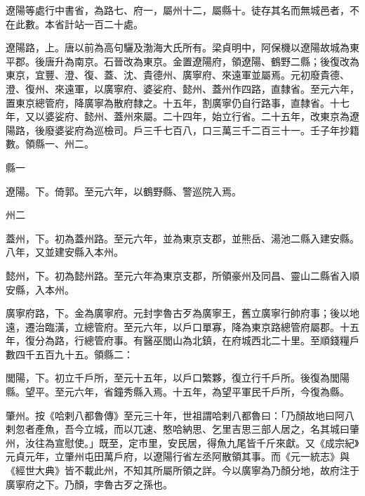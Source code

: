 
\begin{pinyinscope}

 遼陽等處行中書省，為路七、府一，屬州十二，屬縣十。徒存其名而無城邑者，不在此數。本省計站一百二十處。



 遼陽路，上。唐以前為高句驪及渤海大氏所有。梁貞明中，阿保機以遼陽故城為東平郡。後唐升為南京。石晉改為東京。金置遼陽府，領遼陽、鶴野二縣；後復改為東京，宜豐、澄、復、蓋、沈、貴德州、廣寧府、來遠軍並屬焉。元初廢貴德、澄、復州、來遠軍，以廣寧府、婆娑府、懿州、蓋州作四路，直隸省。至元六年，置東京總管府，降廣寧為散府隸之。十五年，割廣寧仍自行路事，直隸省。十七年，又以婆娑府、懿州、蓋州來屬。二十四年，始立行省。二十五年，改東京為遼陽路，後廢婆娑府為巡檢司。戶三千七百八，口三萬三千二百三十一。壬子年抄籍數。領縣一、州二。



 縣一



 遼陽。下。倚郭。至元六年，以鶴野縣、警巡院入焉。



 州二



 蓋州，下。初為蓋州路。至元六年，並為東京支郡，並熊岳、湯池二縣入建安縣。八年，又並建安縣入本州。



 懿州，下。初為懿州路。至元六年為東京支郡，所領豪州及同昌、靈山二縣省入順安縣，入本州。



 廣寧府路，下。金為廣寧府。元封孛魯古歹為廣寧王，舊立廣寧行帥府事；後以地遠，遷治臨潢，立總管府。至元六年，以戶口單寡，降為東京路總管府屬郡。十五年，復分為路，行總管府事。有醫巫閭山為北鎮，在府城西北二十里。至順錢糧戶數四千五百九十五。領縣二：



 閭陽，下。初立千戶所，至元十五年，以戶口繁夥，復立行千戶所。後復為閭陽縣。望平。至元六年，省鐘秀縣入焉。十五年，為望平軍民千戶所，今復為縣。



 肇州。按《哈剌八都魯傳》至元三十年，世祖謂哈剌八都魯曰：「乃顏故地曰阿八剌忽者產魚，吾今立城，而以兀速、憨哈納思、乞里吉思三部人居之，名其城曰肇州，汝往為宣慰使。」既至，定市里，安民居，得魚九尾皆千斤來獻。又《成宗紀》元貞元年，立肇州屯田萬戶府，以遼陽行省左丞阿散領其事。而《元一統志》與《經世大典》皆不載此州，不知其所屬所領之詳。今以廣寧為乃顏分地，故府注于廣寧府之下。乃顏，孛魯古歹之孫也。




\end{pinyinscope}
